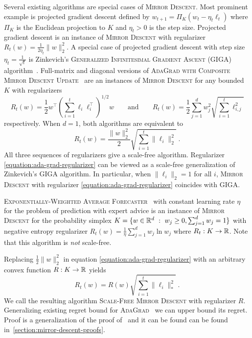 Several existing algorithms are special cases of \textsc{Mirror Descent}. Most
prominent example is projected gradient descent defined by $w_{t+1} = \Pi_K(w_t
- \eta_t \ell_t)$ where $\Pi_K$ is the Euclidean projection to $K$ and
$\eta_t>0$ is the step size.  Projected gradient descent is an instance of
\textsc{Mirror Descent} with regularizer $R_t(w) = \frac{1}{2\eta_t}\|w\|_2^2$.
A special case of projected gradient descent with step size $\eta_t =
\frac{1}{\sqrt{t}}$ is Zinkevich's \textsc{Generalized Infinitesimal Gradient
Ascent} (GIGA) algorithm~\cite{Zinkevich-2003}. Full-matrix and diagonal
versions of \textsc{AdaGrad with Composite Mirror Descent
Update}~\cite{Duchi-Hazan-Singer-2011} are an instances of \textsc{Mirror
Descent} for any bounded $K$ with regularizers
$$
R_t(w) = \frac{1}{2} w^\top \left(\sum_{i=1}^t \ell_i \ell_i^\top \right)^{1/2} \!\!\!\! w
\qquad \text{and} \qquad
R_t(w) = \frac{1}{2} \sum_{j=1}^d w_j^2 \sqrt{ \sum_{i=1}^t \ell_{i,j}^2}
$$
respectively. When $d=1$, both algorithms are equivalent to
\begin{equation}
\label{equation:ada-grad-regularizer}
R_t(w) = \frac{\|w\|_2^2}{2} \sqrt{\sum_{i=1}^t \|\ell_i\|_2^2 } \; .
\end{equation}
All three sequences of regularizers give a scale-free algorithm. Regularizer
\eqref{equation:ada-grad-regularizer} can be viewed as a scale-free generalization of
Zinkevich's GIGA algorithm. In particular, when $\|\ell_i\|_2 = 1$ for all $i$,
\textsc{Mirror Descent} with regularizer \eqref{equation:ada-grad-regularizer}
coincides with GIGA.

\textsc{Exponentially-Weighted Average Forecaster}~\cite[Chapter
2]{Cesa-Bianchi-Lugosi-2006} with constant learning rate $\eta$ for the problem
of prediction with expert advice is an instance of \textsc{Mirror Descent} for
the probability simplex $K = \{ w \in \mathbb{R}^d ~:~ w_j \ge 0, \sum_{j=1}^d w_j = 1
\}$ with negative entropy regularizer $R_t(w) = \frac{1}{\eta} \sum_{j=1}^d w_j
\ln w_j$ where $R_t:K \to \mathbb{R}$. Note that this algorithm is \emph{not}
scale-free.

Replacing $\frac{1}{2}\|w\|_2^2$ in equation \eqref{equation:ada-grad-regularizer} with
an arbitrary convex function $R:K \to \mathbb{R}$ yields
\begin{equation}
\label{equation:scale-free-mirror-descent}
R_t(w) = R(w) \sqrt{\sum_{i=1}^t \|\ell_i\|_*^2} \; .
\end{equation}
We call the resulting algorithm \textsc{Scale-Free Mirror Descent} with
regularizer $R$.  Generalizing existing regret bound for
\textsc{AdaGrad}~\cite{Duchi-Hazan-Singer-2011} we can upper bound its regret.
Proof is a generalization of the proof
of~\cite{Duchi-Shalev-Shwartz-Singer-Tewari-2010,Duchi-Hazan-Singer-2011} and
it can be found can be found in~\ref{section:mirror-descent-proofs}.

